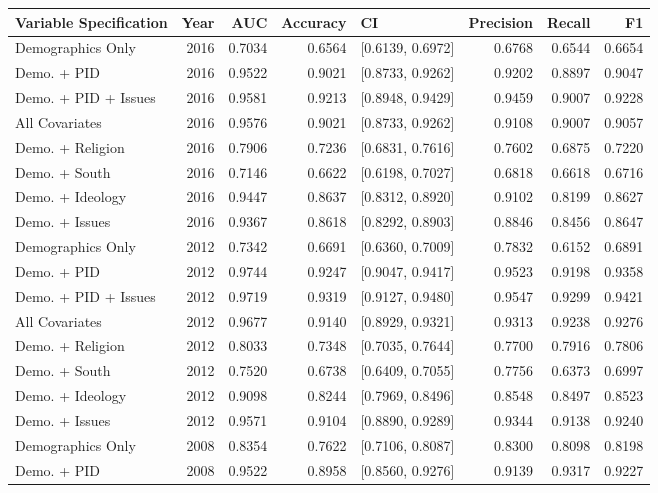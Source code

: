 \begin{longtable}{lrrrlrrr}
  \toprule
Variable Specification & Year & AUC & Accuracy & CI & Precision & Recall & F1 \\ 
  \midrule
Demographics Only & 2016 & 0.7034 & 0.6564 & [0.6139, 0.6972] & 0.6768 & 0.6544 & 0.6654 \\ 
  Demo. + PID & 2016 & 0.9522 & 0.9021 & [0.8733, 0.9262] & 0.9202 & 0.8897 & 0.9047 \\ 
  Demo. + PID + Issues & 2016 & 0.9581 & 0.9213 & [0.8948, 0.9429] & 0.9459 & 0.9007 & 0.9228 \\ 
  All Covariates & 2016 & 0.9576 & 0.9021 & [0.8733, 0.9262] & 0.9108 & 0.9007 & 0.9057 \\ 
  Demo. + Religion & 2016 & 0.7906 & 0.7236 & [0.6831, 0.7616] & 0.7602 & 0.6875 & 0.7220 \\ 
  Demo. + South & 2016 & 0.7146 & 0.6622 & [0.6198, 0.7027] & 0.6818 & 0.6618 & 0.6716 \\ 
  Demo. + Ideology & 2016 & 0.9447 & 0.8637 & [0.8312, 0.8920] & 0.9102 & 0.8199 & 0.8627 \\ 
  Demo. + Issues & 2016 & 0.9367 & 0.8618 & [0.8292, 0.8903] & 0.8846 & 0.8456 & 0.8647 \\ 
  Demographics Only & 2012 & 0.7342 & 0.6691 & [0.6360, 0.7009] & 0.7832 & 0.6152 & 0.6891 \\ 
  Demo. + PID & 2012 & 0.9744 & 0.9247 & [0.9047, 0.9417] & 0.9523 & 0.9198 & 0.9358 \\ 
  Demo. + PID + Issues & 2012 & 0.9719 & 0.9319 & [0.9127, 0.9480] & 0.9547 & 0.9299 & 0.9421 \\ 
  All Covariates & 2012 & 0.9677 & 0.9140 & [0.8929, 0.9321] & 0.9313 & 0.9238 & 0.9276 \\ 
  Demo. + Religion & 2012 & 0.8033 & 0.7348 & [0.7035, 0.7644] & 0.7700 & 0.7916 & 0.7806 \\ 
  Demo. + South & 2012 & 0.7520 & 0.6738 & [0.6409, 0.7055] & 0.7756 & 0.6373 & 0.6997 \\ 
  Demo. + Ideology & 2012 & 0.9098 & 0.8244 & [0.7969, 0.8496] & 0.8548 & 0.8497 & 0.8523 \\ 
  Demo. + Issues & 2012 & 0.9571 & 0.9104 & [0.8890, 0.9289] & 0.9344 & 0.9138 & 0.9240 \\ 
  Demographics Only & 2008 & 0.8354 & 0.7622 & [0.7106, 0.8087] & 0.8300 & 0.8098 & 0.8198 \\ 
  Demo. + PID & 2008 & 0.9522 & 0.8958 & [0.8560, 0.9276] & 0.9139 & 0.9317 & 0.9227 \\ 

\end{longtable}
